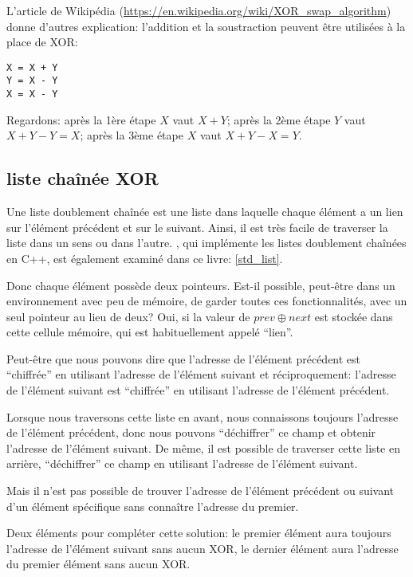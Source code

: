 L'article de Wikipédia (\url{https://en.wikipedia.org/wiki/XOR_swap_algorithm}) donne
d'autres explication: l'addition et la soustraction peuvent être utilisées à la place
de XOR:

\begin{lstlisting}
X = X + Y
Y = X - Y
X = X - Y
\end{lstlisting}

Regardons:
après la 1ère étape $X$ vaut $X+Y$;
après la 2ème étape $Y$ vaut $X+Y-Y=X$;
après la 3ème étape $X$ vaut $X+Y-X=Y$.

\subsection{liste chaînée XOR}

Une liste doublement chaînée est une liste dans laquelle chaque élément a un lien
sur l'élément précédent et sur le suivant.
Ainsi, il est très facile de traverser la liste dans un sens ou dans l'autre.
, qui implémente les listes doublement chaînées en C++, est également
examiné dans ce livre: \ref{std_list}.

Donc chaque élément possède deux pointeurs.
Est-il possible, peut-être dans un environnement avec peu de mémoire, de garder toutes
ces fonctionnalités, avec un seul pointeur au lieu de deux?
Oui, si la valeur de $prev \oplus next$ est stockée dans cette cellule mémoire, qui
est habituellement appelé ``lien''.

Peut-être que nous pouvons dire que l'adresse de l'élément précédent est ``chiffrée''
en utilisant l'adresse de l'élément suivant et réciproquement:
l'adresse de l'élément suivant est ``chiffrée'' en utilisant l'adresse de l'élément
précédent.

Lorsque nous traversons cette liste en avant, nous connaissons toujours l'adresse
de l'élément précédent, donc nous pouvons ``déchiffrer'' ce champ et obtenir l'adresse
de l'élément suivant.
De même, il est possible de traverser cette liste en arrière, ``déchiffrer'' ce champ
en utilisant l'adresse de l'élément suivant.

Mais il n'est pas possible de trouver l'adresse de l'élément précédent ou suivant
d'un élément spécifique sans connaître l'adresse du premier.

Deux éléments pour compléter cette solution: le premier élément aura toujours l'adresse
de l'élément suivant sans aucun XOR, le dernier élément aura l'adresse du premier
élément sans aucun XOR.

